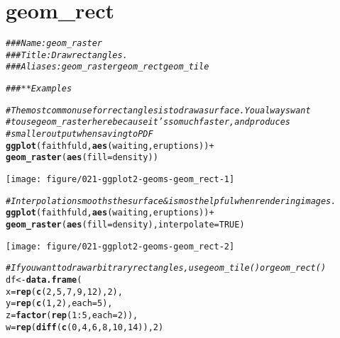 \documentclass[a4paper,titlepage]{tufte-handout}\usepackage[]{graphicx}\usepackage[]{color}
\makeatletter
\def\maxwidth{ %
  \ifdim\Gin@nat@width>\linewidth
    \linewidth
  \else
    \Gin@nat@width
  \fi
}
\newcommand{\hlnum}[1]{\textcolor[rgb]{0.686,0.059,0.569}{#1}}%
\newcommand{\hlcom}[1]{\textcolor[rgb]{0.678,0.584,0.686}{\textit{#1}}}%
\newcommand{\hlopt}[1]{\textcolor[rgb]{0,0,0}{#1}}%
\newcommand{\hlstd}[1]{\textcolor[rgb]{0.345,0.345,0.345}{#1}}%
\newcommand{\hlkwb}[1]{\textcolor[rgb]{0.69,0.353,0.396}{#1}}%
\newcommand{\hlkwc}[1]{\textcolor[rgb]{0.333,0.667,0.333}{#1}}%
\newcommand{\hlkwd}[1]{\textcolor[rgb]{0.737,0.353,0.396}{\textbf{#1}}}%
\newenvironment{kframe}{%
 \def\at@end@of@kframe{}%
 \ifinner\ifhmode%
  \def\at@end@of@kframe{\end{minipage}}%
  \begin{minipage}{\columnwidth}%
 \fi\fi%
 \def\FrameCommand##1{\hskip\@totalleftmargin \hskip-\fboxsep
 \colorbox{shadecolor}{##1}\hskip-\fboxsep
     \hskip-\linewidth \hskip-\@totalleftmargin \hskip\columnwidth}%
 \MakeFramed {\advance\hsize-\width
   \@totalleftmargin\z@ \linewidth\hsize
   \@setminipage}}%
 {\par\unskip\endMakeFramed%
 \at@end@of@kframe}
\newenvironment{knitrout}{}{} %
\makeatother
\begin{document}
\section{geom\_rect}

\begin{knitrout}
\color{fgcolor}\begin{kframe}
\begin{alltt}
\hlcom{### Name: geom_raster}
\hlcom{### Title: Draw rectangles.}
\hlcom{### Aliases: geom_raster geom_rect geom_tile}

\hlcom{### ** Examples}

\hlcom{# The most common use for rectangles is to draw a surface. You always want}
\hlcom{# to use geom_raster here because it's so much faster, and produces}
\hlcom{# smaller output when saving to PDF}
\hlkwd{ggplot}\hlstd{(faithfuld,} \hlkwd{aes}\hlstd{(waiting, eruptions))} \hlopt{+}
 \hlkwd{geom_raster}\hlstd{(}\hlkwd{aes}\hlstd{(}\hlkwc{fill} \hlstd{= density))}
\end{alltt}
\end{kframe}
\texttt{[image: figure/021-ggplot2-geoms-geom\_rect-1]} 
\begin{kframe}\begin{alltt}
\hlcom{# Interpolation smooths the surface & is most helpful when rendering images.}
\hlkwd{ggplot}\hlstd{(faithfuld,} \hlkwd{aes}\hlstd{(waiting, eruptions))} \hlopt{+}
 \hlkwd{geom_raster}\hlstd{(}\hlkwd{aes}\hlstd{(}\hlkwc{fill} \hlstd{= density),} \hlkwc{interpolate} \hlstd{=} \hlnum{TRUE}\hlstd{)}
\end{alltt}
\end{kframe}
\texttt{[image: figure/021-ggplot2-geoms-geom\_rect-2]} 
\begin{kframe}\begin{alltt}
\hlcom{# If you want to draw arbitrary rectangles, use geom_tile() or geom_rect()}
\hlstd{df} \hlkwb{<-} \hlkwd{data.frame}\hlstd{(}
  \hlkwc{x} \hlstd{=} \hlkwd{rep}\hlstd{(}\hlkwd{c}\hlstd{(}\hlnum{2}\hlstd{,} \hlnum{5}\hlstd{,} \hlnum{7}\hlstd{,} \hlnum{9}\hlstd{,} \hlnum{12}\hlstd{),} \hlnum{2}\hlstd{),}
  \hlkwc{y} \hlstd{=} \hlkwd{rep}\hlstd{(}\hlkwd{c}\hlstd{(}\hlnum{1}\hlstd{,} \hlnum{2}\hlstd{),} \hlkwc{each} \hlstd{=} \hlnum{5}\hlstd{),}
  \hlkwc{z} \hlstd{=} \hlkwd{factor}\hlstd{(}\hlkwd{rep}\hlstd{(}\hlnum{1}\hlopt{:}\hlnum{5}\hlstd{,} \hlkwc{each} \hlstd{=} \hlnum{2}\hlstd{)),}
  \hlkwc{w} \hlstd{=} \hlkwd{rep}\hlstd{(}\hlkwd{diff}\hlstd{(}\hlkwd{c}\hlstd{(}\hlnum{0}\hlstd{,} \hlnum{4}\hlstd{,} \hlnum{6}\hlstd{,} \hlnum{8}\hlstd{,} \hlnum{10}\hlstd{,} \hlnum{14}\hlstd{)),} \hlnum{2}\hlstd{)}

\end{alltt}
\end{kframe}
\end{knitrout}
\end{document}
